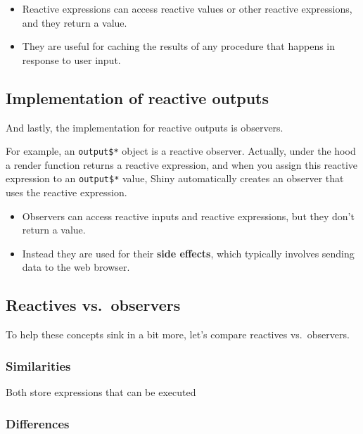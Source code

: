 \documentclass[
  letterpaper,
  DIV=11,
  numbers=noendperiod]{scrreprt}
\begin{document}
\begin{itemize}
\item
  Reactive expressions can access reactive values or other reactive
  expressions, and they return a value.
\item
  They are useful for caching the results of any procedure that happens
  in response to user input.
\end{itemize}

\hypertarget{implementation-of-reactive-outputs}{%
\subsection{Implementation of reactive
outputs}\label{implementation-of-reactive-outputs}}

And lastly, the implementation for reactive outputs is observers.

For example, an \texttt{output\$*} object is a reactive observer.
Actually, under the hood a render function returns a reactive
expression, and when you assign this reactive expression to an
\texttt{output\$*} value, Shiny automatically creates an observer that
uses the reactive expression.

\begin{itemize}
\item
  Observers can access reactive inputs and reactive expressions, but
  they don't return a value.
\item
  Instead they are used for their \textbf{side effects}, which typically
  involves sending data to the web browser.
\end{itemize}

\hypertarget{reactives-vs.-observers}{%
\subsection{Reactives vs.~observers}\label{reactives-vs.-observers}}

To help these concepts sink in a bit more, let's compare reactives
vs.~observers.

\hypertarget{similarities}{%
\subsubsection{Similarities}\label{similarities}}

Both store expressions that can be executed

\hypertarget{differences}{%
\subsubsection{Differences}\label{differences}}
\end{document}
